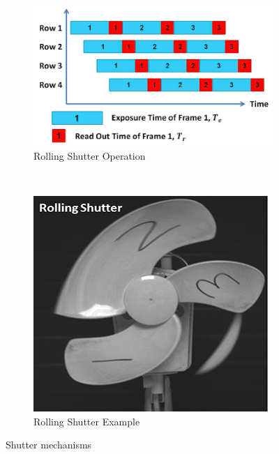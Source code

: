 \begin{figure}[!htb]
\begin{subfigure}[h]{0.1\textwidth}
	\end{subfigure}
	\\
	\begin{subfigure}[h]{0.3\textwidth}
		\includegraphics[width=\textwidth]{fig/rolling_shutter.png}
		\caption{Rolling Shutter Operation}
	\end{subfigure}
	~
	\begin{subfigure}[h]{0.1\textwidth}
		\includegraphics[width=\textwidth]{fig/fan_rolling}
		\caption{Rolling Shutter Example}
	\end{subfigure}
\caption{Shutter mechanisms}
\label{fig:compare_shutter}
\end{figure}

